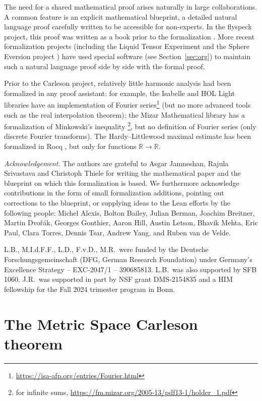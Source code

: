 \documentclass[12pt]{amsart}
\newcommand*{\real}{\mathbb{R}} %
\theoremstyle{definition}
\theoremstyle{plain}
\begin{document}
The need for a shared mathematical proof arises naturally in large collaborations.
A common feature is an explicit mathematical blueprint, a detailed natural language proof carefully written to be accessible for non-experts. In the flyspeck project, this proof was written as a book prior to the formalization \cite{HalesFlyspeckBook}. More recent formalization projects (including the Liquid Tensor Experiment and the Sphere Eversion project \cite{SphereEversionCPP}) have used special software (see Section~\ref{sec:org}) to maintain such a natural language proof side by side with the formal proof.

Prior to the Carleson project, relatively little harmonic analysis had been formalized in any proof assistant: for example, the Isabelle and HOL Light libraries have an implementation of Fourier series\footnote{\url{https://isa-afp.org/entries/Fourier.html}} (but no more advanced tools such as the real interpolation theorem); the Mizar Mathematical library has a formalization of Minkowski's inequality \footnote{for infinite sums, \url{https://fm.mizar.org/2005-13/pdf13-1/holder_1.pdf}}, but no definition of Fourier series (only discrete Fourier transforms).
The Hardy--Littlewood maximal estimate has been formalized in Rocq \cites{AffeldtFTCRocq,AffeldtLebesgueDiffRocq}, but only for functions $\real\to\real$.

\noindent \textit{Acknowledgement.}
The authors are grateful to Asgar Jamneshan, Rajula Srivastava and Christoph Thiele for writing the mathematical paper \cite{ThieleCarlesonPreprint} and the blueprint \cite{CarlesonBlueprint} on which this formalization is based.
We furthermore acknowledge contributions in the form of small formalization additions,
pointing out corrections to the blueprint,
or supplying ideas to the Lean efforts by the following people:
Michel Alexis,
Bolton Bailey,
Julian Berman,
Joachim Breitner,
Martin Dvořák,
Georges Gonthier,
Aaron Hill,
Austin Letson,
Bhavik Mehta,
Eric Paul,
Clara Torres,
Dennis Tsar,
Andrew Yang, and
Ruben van de Velde.

L.B., M.I.d.F.F., L.D., F.v.D., M.R.\ were funded by the Deutsche For\-schungs\-gemein\-schaft (DFG, German Research Foundation) under Germany's Excellence Strategy -- EXC-2047/1 -- 390685813.
L.B.\ was also supported by SFB 1060.
J.R.\ was supported in part by NSF grant DMS-2154835 and a HIM fellowship for the Fall 2024 trimester program in Bonn.

\section{The Metric Space Carleson theorem}\label{sec:main_thm}
\end{document}
